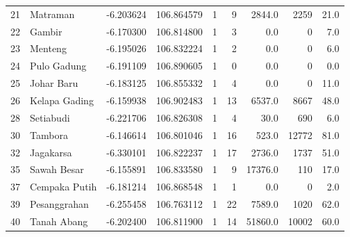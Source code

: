 \begin{table}
\begin{adjustbox}{width=\textwidth}
\begin{tabular}{llrrrrrrr}
21 &       Matraman & -6.203624 &  106.864579 &               1 &             9 &                  2844.0 &                              2259 &                    21.0 \\
22 &         Gambir & -6.170300 &  106.814800 &               1 &             3 &                     0.0 &                                 0 &                     7.0 \\
23 &        Menteng & -6.195026 &  106.832224 &               1 &             2 &                     0.0 &                                 0 &                     6.0 \\
24 &    Pulo Gadung & -6.191109 &  106.890605 &               1 &             0 &                     0.0 &                                 0 &                     0.0 \\
25 &     Johar Baru & -6.183125 &  106.855332 &               1 &             4 &                     0.0 &                                 0 &                    11.0 \\
26 &  Kelapa Gading & -6.159938 &  106.902483 &               1 &            13 &                  6537.0 &                              8667 &                    48.0 \\
28 &      Setiabudi & -6.221706 &  106.826308 &               1 &             4 &                    30.0 &                               690 &                     6.0 \\
30 &        Tambora & -6.146614 &  106.801046 &               1 &            16 &                   523.0 &                             12772 &                    81.0 \\
32 &      Jagakarsa & -6.330101 &  106.822237 &               1 &            17 &                  2736.0 &                              1737 &                    51.0 \\
35 &    Sawah Besar & -6.155891 &  106.833580 &               1 &             9 &                 17376.0 &                               110 &                    17.0 \\
37 &  Cempaka Putih & -6.181214 &  106.868548 &               1 &             1 &                     0.0 &                                 0 &                     2.0 \\
39 &   Pesanggrahan & -6.255458 &  106.763112 &               1 &            22 &                  7589.0 &                              1020 &                    62.0 \\
40 &    Tanah Abang & -6.202400 &  106.811900 &               1 &            14 &                 51860.0 &                             10002 &                    60.0 \\
\bottomrule
\end{tabular}
\end{adjustbox}
\end{table}

